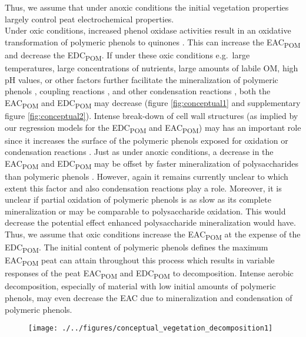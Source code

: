 \documentclass[alpha-refs]{wiley-article-rmd}
\begin{document}
\begin{refsection}
Thus, we assume that under anoxic conditions the initial vegetation properties largely control peat electrochemical properties.\\
Under oxic conditions, increased phenol oxidase activities result in an oxidative transformation of polymeric phenols to quinones \autocite{Fenner.2011,Schellekens.2015,Bolton.2018}. This can increase the EAC\textsubscript{POM} and decrease the EDC\textsubscript{POM}. If under these oxic conditions e.g.~large temperatures, large concentrations of nutrients, large amounts of labile OM, high pH values, or other factors further facilitate the mineralization of polymeric phenols \autocite{Bragazza.2007,Fenner.2011,Kang.2018c,Bowring.2020}, coupling reactions \autocite{Hotta.2002,Johnson.2015,Bolton.2018,Zhao.2020}, and other condensation reactions \autocite{Bolton.2018,Olk.2006,Heitmann.2006,Yu.2016}, both the EAC\textsubscript{POM} and EDC\textsubscript{POM} may decrease (figure \ref{fig:conceptual1} and supplementary figure \ref{fig:conceptual2}). Intense break-down of cell wall structures (as implied by our regression models for the EDC\textsubscript{POM} and EAC\textsubscript{POM}) may has an important role since it increases the surface of the polymeric phenols exposed for oxidation or condensation reactions \autocite{Tsuneda.2001}. Just as under anoxic conditions, a decrease in the EAC\textsubscript{POM} and EDC\textsubscript{POM} may be offset by faster mineralization of polysaccharides than polymeric phenols \autocite{Benner.1984}. However, again it remains currently unclear to which extent this factor and also condensation reactions play a role. Moreover, it is unclear if partial oxidation of polymeric phenols is as slow as its complete mineralization or may be comparable to polysaccharide oxidation. This would decrease the potential effect enhanced polysaccharide mineralization would have. Thus, we assume that oxic conditions increase the EAC\textsubscript{POM} at the expense of the EDC\textsubscript{POM}. The initial content of polymeric phenols defines the maximum EAC\textsubscript{POM} peat can attain throughout this process which results in variable responses of the peat EAC\textsubscript{POM} and EDC\textsubscript{POM} to decomposition. Intense aerobic decomposition, especially of material with low initial amounts of polymeric phenols, may even decrease the EAC due to mineralization and condensation of polymeric phenols.

\begin{figure}[H]

{\centering \texttt{[image: ./../figures/conceptual\_vegetation\_decomposition1]}

}
\end{figure}
\end{refsection}
\end{document}
